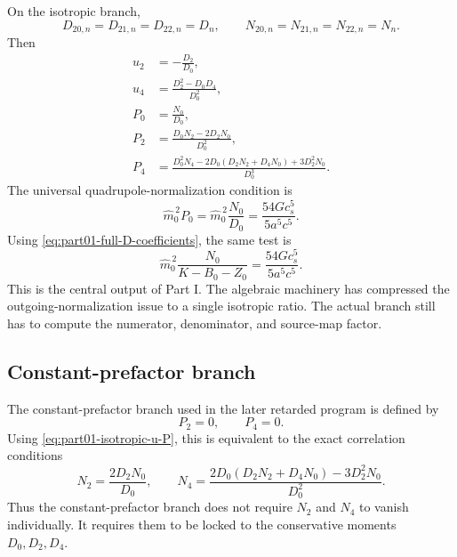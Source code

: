 On the isotropic branch,
\begin{equation}
D_{20,n}=D_{21,n}=D_{22,n}=D_n,
\qquad
N_{20,n}=N_{21,n}=N_{22,n}=N_n.
\end{equation}
Then
\begin{equation}
\label{eq:part01-isotropic-u-P}
\boxed{
\begin{aligned}
u_2&=-\frac{D_2}{D_0},\\
u_4&=\frac{D_2^2-D_0D_4}{D_0^2},\\
P_0&=\frac{N_0}{D_0},\\
P_2&=\frac{D_0N_2-2D_2N_0}{D_0^2},\\
P_4&=
\frac{D_0^2N_4-2D_0(D_2N_2+D_4N_0)+3D_2^2N_0}
{D_0^3}.
\end{aligned}
}
\end{equation}
The universal quadrupole-normalization condition is
\begin{equation}
\label{eq:part01-normalization-condition}
\boxed{
\widehat m_0^{\,2}P_0
=
\widehat m_0^{\,2}\frac{N_0}{D_0}
=
\frac{54G c_s^5}{5a^5c^5}}.
\end{equation}
Using \eqref{eq:part01-full-D-coefficients}, the same test is
\begin{equation}
\label{eq:part01-final-normalization}
\boxed{
\widehat m_0^{\,2}
\frac{N_0}{K-B_0-Z_0}
=
\frac{54G c_s^5}{5a^5c^5}}.
\end{equation}
This is the central output of Part I.  The algebraic machinery has compressed the outgoing-normalization issue to a single isotropic ratio.  The actual branch still has to compute the numerator, denominator, and source-map factor.

\subsection{Constant-prefactor branch}
\label{subsec:part01-constant-prefactor-branch}

The constant-prefactor branch used in the later retarded program is defined by
\begin{equation}
P_2=0,
\qquad
P_4=0.
\end{equation}
Using \eqref{eq:part01-isotropic-u-P}, this is equivalent to the exact correlation conditions
\begin{equation}
\label{eq:part01-constant-prefactor-conditions}
\boxed{
N_2=\frac{2D_2N_0}{D_0},
\qquad
N_4=\frac{2D_0(D_2N_2+D_4N_0)-3D_2^2N_0}{D_0^2}}.
\end{equation}
Thus the constant-prefactor branch does not require \(N_2\) and \(N_4\) to vanish individually.  It requires them to be locked to the conservative moments \(D_0,D_2,D_4\).

